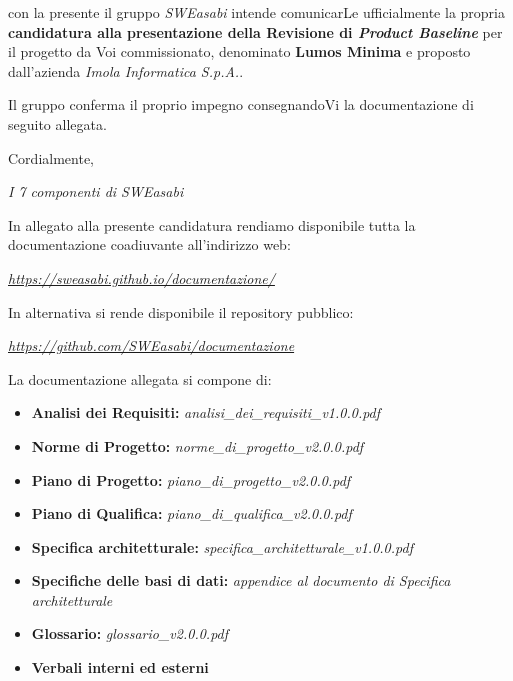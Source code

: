 \documentclass{article}
\begin{document}
con la presente il gruppo \textit{SWEasabi} intende comunicarLe ufficialmente la propria \textbf{candidatura alla presentazione della Revisione di \textit{Product Baseline}} per il progetto da Voi commissionato, denominato \textbf{Lumos Minima} e proposto dall'azienda \textit{Imola Informatica S.p.A.}.

Il gruppo conferma il proprio impegno consegnandoVi la documentazione di seguito allegata.

Cordialmente,

\begin{flushright}
\textit{I 7 componenti di SWEasabi}
\end{flushright}

In allegato alla presente candidatura rendiamo disponibile tutta la documentazione coadiuvante all'indirizzo web:

\begin{center}
    \href{https://sweasabi.github.io/documentazione/}{\textit{https://sweasabi.github.io/documentazione/}}
\end{center}

In alternativa si rende disponibile il repository pubblico:

\begin{center}
    \href{https://github.com/SWEasabi/documentazione}{\textit{https://github.com/SWEasabi/documentazione}}

\end{center}

La documentazione allegata si compone di:
\begin{itemize}
    \item \textbf{Analisi dei Requisiti:} \textit{analisi\_dei\_requisiti\_v1.0.0.pdf}
    \item \textbf{Norme di Progetto:} \textit{norme\_di\_progetto\_v2.0.0.pdf}
    \item \textbf{Piano di Progetto:} \textit{piano\_di\_progetto\_v2.0.0.pdf}
    \item \textbf{Piano di Qualifica:} \textit{piano\_di\_qualifica\_v2.0.0.pdf}
    \item \textbf{Specifica architetturale:} \textit{specifica\_architetturale\_v1.0.0.pdf}
    \item \textbf{Specifiche delle basi di dati:} \textit{appendice al documento di Specifica architetturale}
    \item \textbf{Glossario:} \textit{glossario\_v2.0.0.pdf}
    \item \textbf{Verbali interni ed esterni}
\end{itemize}
\end{document}
